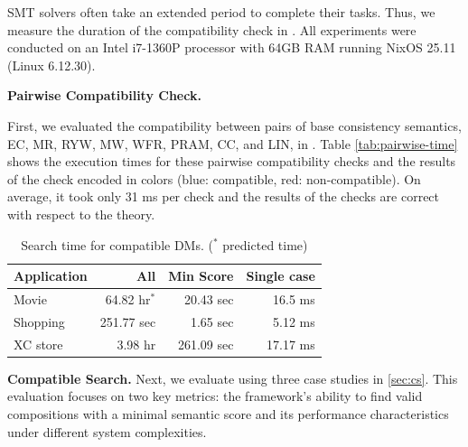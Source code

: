 SMT solvers often take an extended period to complete their tasks.
Thus, we measure the
duration of the compatibility check in \sysname{}.
All experiments were conducted on an Intel i7-1360P processor with
64GB RAM running NixOS 25.11 (Linux 6.12.30).


\textbf{Pairwise Compatibility Check.}

First, we evaluated the compatibility between pairs of base
consistency semantics,
EC, MR, RYW, MW, WFR, PRAM, CC, and LIN, in \sysname{}.
Table \ref{tab:pairwise-time} shows the execution times for these
pairwise compatibility checks and the results of the check encoded in
colors (blue: compatible, red: non-compatible). On average, it took
only 31 ms per check and the results of the checks are correct with
respect to the theory.


\begin{table}
	\center
	\small
	\begin{tabular}{ |l|r|r|r| }
		\hline
		Application & All & Min Score & Single case \\
		\hline
		Movie    & 64.82 hr$^*$ & 20.43 sec  & 16.5 ms\\
		Shopping & 251.77 sec   & 1.65 sec   & 5.12 ms \\
		XC store & 3.98 hr      & 261.09 sec & 17.17 ms\\
		\hline
	\end{tabular}
        \caption{Search time for compatible DMs. ($^*$ predicted time)}
	\label{tbl:searchtime}
\end{table}
\textbf{Compatible \sysmod{} Search.} Next, we evaluate \sysname{} using
three case studies in \cref{sec:cs}.
This evaluation focuses on two key metrics: the framework's ability to
find valid compositions with a minimal semantic score and its
performance characteristics under different system complexities.

